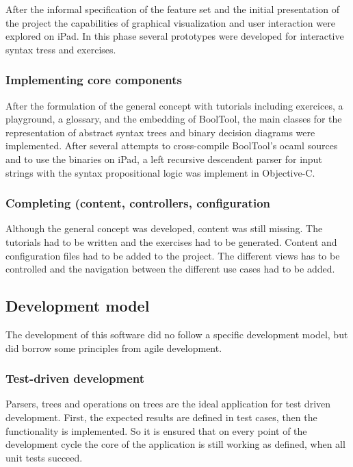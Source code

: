 After the informal specification of the feature set and the initial presentation of the project
the capabilities of graphical visualization and  user interaction were explored on iPad.
In this phase several prototypes were developed for interactive syntax tress and exercises.

\subsubsection{Implementing core components}


After the formulation of the general concept with tutorials including exercices, a playground, a glossary, and the embedding of BoolTool,
the main classes for the representation of abstract syntax trees and binary decision diagrams were implemented.
After several attempts to cross-compile BoolTool's ocaml sources and to use the binaries on iPad, a left recursive descendent parser for input strings with the syntax propositional logic was implement in Objective-C. 

\subsubsection{Completing (content, controllers, configuration}

Although the general concept was developed, content was still missing. The tutorials had to be written and the exercises had to be generated. Content and configuration files had to be added to the project. 
The different views has to be controlled and the navigation between the different use cases had to be added. 

\subsection{Development model}

The development of this software did no follow a specific development model, 
but did borrow some principles from agile development.

\subsubsection{Test-driven development}

Parsers, trees and operations on trees are the ideal application for test driven development.
First, the expected results are defined in test cases, then the functionality is implemented.
So it is ensured that on every point of the development cycle 
the core of the application is still working as defined,
when all unit tests succeed.


